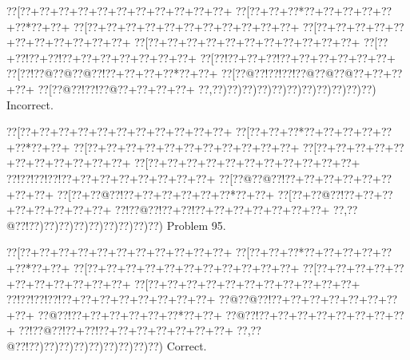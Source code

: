 \documentclass[a5paper]{article}
\begin{document}
\begin{center}
{\goo
\0??[\0??+\0??+\0??+\0??+\0??+\0??+\0??+\0??+\0??+\0??+\0??+
\0??[\0??+\0??+\0??*\0??+\0??+\0??+\0??+\0??+\0??*\0??+\0??+
\0??[\0??+\0??+\0??+\0??+\0??+\0??+\0??+\0??+\0??+\0??+\0??+
\0??[\0??+\0??+\0??+\0??+\0??+\0??+\0??+\0??+\0??+\0??+\0??+
\0??[\0??+\0??+\0??+\0??+\0??+\0??+\0??+\0??+\0??+\0??+\0??+
\0??[\0??+\0??!\0??+\0??!\0??+\0??+\0??+\0??+\0??+\0??+\0??+
\0??[\0??!\0??+\0??+\0??!\0??+\0??+\0??+\0??+\0??+\0??+
\0??[\0??!\0??@\0??@\0??@\0??!\0??+\0??+\0??+\0??*\0??+\0??+
\0??[\0??@\0??!\0??!\0??!\0??@\0??@\0??@\0??+\0??+\0??+\0??+
\0??[\0??@\0??!\0??!\0??@\0??+\0??+\0??+\0??+
\0??,\0??)\0??)\0??)\0??)\0??)\0??)\0??)\0??)\0??)\0??)\0??)
}
Incorrect. 

\end{center}
\newpage
\begin{center}
{\goo
\0??[\0??+\0??+\0??+\0??+\0??+\0??+\0??+\0??+\0??+\0??+\0??+
\0??[\0??+\0??+\0??*\0??+\0??+\0??+\0??+\0??+\0??*\0??+\0??+
\0??[\0??+\0??+\0??+\0??+\0??+\0??+\0??+\0??+\0??+\0??+\0??+
\0??[\0??+\0??+\0??+\0??+\0??+\0??+\0??+\0??+\0??+\0??+\0??+
\0??[\0??+\0??+\0??+\0??+\0??+\0??+\0??+\0??+\0??+\0??+\0??+
\0??!\0??!\0??!\0??!\0??+\0??+\0??+\0??+\0??+\0??+\0??+\0??+
\0??[\0??@\0??@\0??!\0??+\0??+\0??+\0??+\0??+\0??+\0??+\0??+
\0??[\0??+\0??@\0??!\0??+\0??+\0??+\0??+\0??+\0??*\0??+\0??+
\0??[\0??+\0??@\0??!\0??+\0??+\0??+\0??+\0??+\0??+\0??+\0??+
\0??!\0??@\0??!\0??+\0??!\0??+\0??+\0??+\0??+\0??+\0??+\0??+
\0??,\0??@\0??!\0??)\0??)\0??)\0??)\0??)\0??)\0??)\0??)\0??)
}
Problem 95.

\end{center}
\begin{center}
{\goo
\0??[\0??+\0??+\0??+\0??+\0??+\0??+\0??+\0??+\0??+\0??+\0??+
\0??[\0??+\0??+\0??*\0??+\0??+\0??+\0??+\0??+\0??*\0??+\0??+
\0??[\0??+\0??+\0??+\0??+\0??+\0??+\0??+\0??+\0??+\0??+\0??+
\0??[\0??+\0??+\0??+\0??+\0??+\0??+\0??+\0??+\0??+\0??+\0??+
\0??[\0??+\0??+\0??+\0??+\0??+\0??+\0??+\0??+\0??+\0??+\0??+
\0??!\0??!\0??!\0??!\0??+\0??+\0??+\0??+\0??+\0??+\0??+\0??+
\0??@\0??@\0??!\0??+\0??+\0??+\0??+\0??+\0??+\0??+\0??+
\0??@\0??!\0??+\0??+\0??+\0??+\0??+\0??*\0??+\0??+
\0??@\0??!\0??+\0??+\0??+\0??+\0??+\0??+\0??+\0??+
\0??!\0??@\0??!\0??+\0??!\0??+\0??+\0??+\0??+\0??+\0??+\0??+
\0??,\0??@\0??!\0??)\0??)\0??)\0??)\0??)\0??)\0??)\0??)\0??)
}
Correct. 

\end{center}
\end{document}
